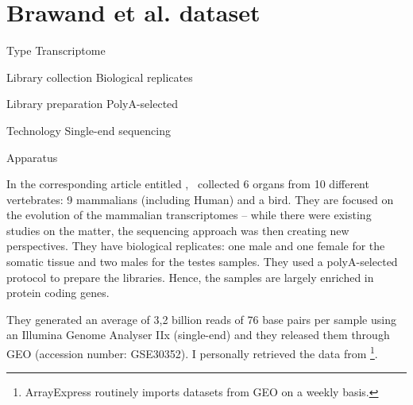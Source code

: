 \clearpage
\section{Brawand et al. dataset}
\label{ch:vtData}

\begin{eqlist}
    \item[Type] Transcriptome
    \item[Library collection] Biological replicates
    \item[Library preparation] PolyA-selected
    \item[Technology] Single-end sequencing
    \item[Apparatus]
\end{eqlist}

In the corresponding article entitled ,
 \citet{VTpaper}~collected 6 organs from 10 different vertebrates:
 9 mammalians (including Human) and a bird. They are focused on the
 evolution of the mammalian transcriptomes -- while there were existing studies
 on the matter, the sequencing approach was then creating new perspectives.
 They have biological replicates: one male
 and one female for the somatic tissue and two males for the testes samples.
 They used a
 polyA-selected protocol to prepare the libraries. Hence, the samples are largely
 enriched in protein coding genes.

 They generated an average of 3,2 billion reads of 76 base pairs per sample
 using an Illumina Genome Analyser IIx (single-end) and they released them
 through \gls{GEO} (accession number: GSE30352).
 I personally retrieved the data from
 \footnote{ArrayExpress routinely imports
 datasets from \gls{GEO} on a weekly basis.}.


\clearpage
